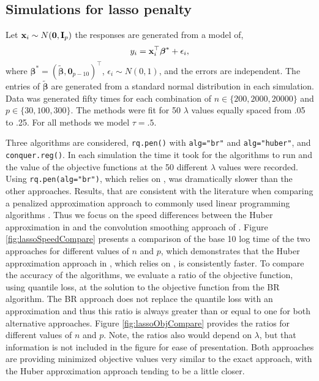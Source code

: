 \subsection{Simulations for lasso penalty}\label{simulations-for-lasso-penalty}

Let \({\bf x}_i \sim N({\bf 0}, {\bf I}_p)\) the responses are generated from a model of,\\
\begin{equation}
y_i = {\bf x}_i^\top \boldsymbol \beta^* + \epsilon_i,
\label{eq:dgp}
\end{equation}
where \(\boldsymbol \beta^*=(\tilde{\boldsymbol \beta},\mathbf{0}_{p-10})^\top\), \(\epsilon_i \sim N(0,1)\), and the errors are independent. The entries of \(\tilde{\boldsymbol \beta}\) are generated from a standard normal distribution in each simulation. Data was generated fifty times for each combination of \(n \in \{200,2000,20000\}\) and \(p \in \{30,100,300\}\). The methods were fit for 50 \(\lambda\) values equally spaced from .05 to .25. For all methods we model \(\tau=.5\).

Three algorithms are considered, \texttt{rq.pen()} with \texttt{alg="br"} and \texttt{alg="huber"}, and \texttt{conquer.reg()}. In each simulation the time it took for the algorithms to run and the value of the objective functions at the 50 different \(\lambda\) values were recorded. Using \texttt{rq.pen(alg="br")}, which relies on , was dramatically slower than the other approaches. Results, that are consistent with the literature when comparing a penalized approximation approach to commonly used linear programming algorithms \citep{huber_cd, highdConv}. Thus we focus on the speed differences between the Huber approximation in  and the convolution smoothing approach of . Figure \ref{fig:lassoSpeedCompare} presents a comparison of the base 10 log time of the two approaches for different values of \(n\) and \(p\), which demonstrates that the Huber approximation approach in , which relies on , is consistently faster. To compare the accuracy of the algorithms, we evaluate a ratio of the objective function, using quantile loss, at the solution to the objective function from the BR algorithm. The BR approach does not replace the quantile loss with an approximation and thus this ratio is always greater than or equal to one for both alternative approaches. Figure \ref{fig:lassoObjCompare} provides the ratios for different values of \(n\) and \(p\). Note, the ratios also would depend on \(\lambda\), but that information is not included in the figure for ease of presentation. Both approaches are providing minimized objective values very similar to the exact approach, with the Huber approximation approach tending to be a little closer.

